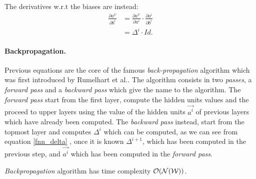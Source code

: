 The derivatives w.r.t the biases are instead:
\begin{align}
\frac{\partial a^U}{\partial b^i} &= \frac{\partial a^U}{\partial a^i} \cdot \frac{\partial a^i}{\partial b^i}\\
&= \Delta^{i} \cdot Id.
\end{align}


\paragraph{Backpropagation.}
Previous equations are the core of the famous \textit{back-propagation} algorithm which was first introduced by Rumelhart et al.\cite{Rumelhart86}.
The algorithm consists in two \textit{passes}, a \textit{forward pass} and a \textit{backward pass} which give the name to the algorithm.
The \textit{forward pass} start from the first layer, compute the hidden units values and the proceed to upper layers using the value of the hidden units 
$\vec{a^i}$ of previous layers which have already been computed. The \textit{backward pass} instead, start from the topmost layer and computes $\Delta^{i}$
which can be computed, as we can see from equation \ref{fnn_delta} , once it is known $\Delta^{i+1}$, which has been computed in the previous step, and $\vec{a^i}$ which
has been computed in the \textit{forward pass}.

\textit{Backpropagation} algorithm has time complexity $\mathcal{O}(\mathcal{N}(\mathcal{W}))$.

